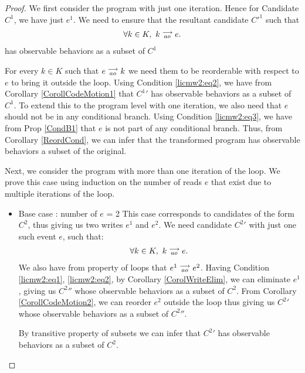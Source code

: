 \begin{proof}

    We first consider the program with just one iteration. 
    Hence for Candidate $C^1$, we have just $e^1$. 
    We need to ensure that the resultant candidate $C'^1$ such that 
    \begin{align*}
        \forall k \in K, \ k\stackrel{\longrightarrow}{_{ao}}e.
    \end{align*}  
    has observable behaviors as a subset of $C^1$

    For every $k \in K$ such that $e\stackrel{\longrightarrow}{_{ao}}k$ we need them to be reorderable with respect to $e$ to bring it outside the loop.
    Using Condition \ref{licmw2:eq2}, we have from Corollary \ref{CorollCodeMotion1} that $C^1'$ has observable behaviors as a subset of $C^1$.
    To extend this to the program level with one iteration, we also need that $e$ should not be in any conditional branch.
    Using Condition \ref{licmw2:eq3}, we have from Prop \ref{CondB1} that $e$ is not part of any conditional branch.
    Thus, from Corollary \ref{ReordCond}, we can infer that the transformed program has observable behaviors a subset of the original.   
    
    Next, we consider the program with more than one iteration of the loop. 
    We prove this case using induction on the number of reads $e$ that exist due to multiple iterations of the loop. 

    \begin{itemize}

        \item Base case : number of $e$ = 2
        This case corresponds to candidates of the form $C^2$, thus giving us two writes $e^1$ and $e^2$.
        We need candidate $C^2'$ with just one such event $e$, such that:
        \begin{align*}
            \forall k \in K, \ k\stackrel{\longrightarrow}{_{ao}}e.
        \end{align*}  
        We also have from property of loops that $e^1\stackrel{\longrightarrow}{_{ao}}e^2$.
        Having Condition \ref{licmw2:eq1}, \ref{licmw2:eq2}, by Corollary \ref{CorolWriteElim}, we can eliminate $e^1$, giving us $C^2''$ whose observable behaviors as a subset of $C^2$.  
        From Corollary \ref{CorollCodeMotion2}, we can reorder $e^2$ outside the loop thus giving us $C^2'$ whose observable behaviors as a subset of $C^2''$.
        
        By transitive property of subsets we can infer that $C^2'$ has observable behaviors as a subset of $C^2$.
        

\end{itemize}
\end{proof}
